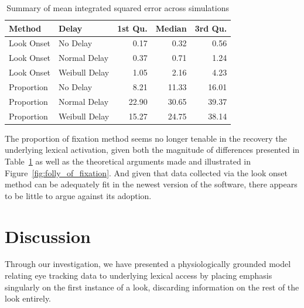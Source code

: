 \begin{table}[H]
\centering
\begin{tabular}{llrrr}
  \hline
Method & Delay & 1st Qu. & Median & 3rd Qu. \\ 
  \hline
Look Onset & No Delay & 0.17 & 0.32 & 0.56 \\ 
  Look Onset & Normal Delay & 0.37 & 0.71 & 1.24 \\ 
  Look Onset & Weibull Delay & 1.05 & 2.16 & 4.23 \\ 
  Proportion & No Delay & 8.21 & 11.33 & 16.01 \\ 
  Proportion & Normal Delay & 22.90 & 30.65 & 39.37 \\ 
  Proportion & Weibull Delay & 15.27 & 24.75 & 38.14 \\ 
   \hline
\end{tabular}
\caption{Summary of mean integrated squared error across simulations}
\label{tab:mise_sims}
\end{table}

The proportion of fixation method seems no longer tenable in the recovery the underlying lexical activation, given both the magnitude of differences presented in Table~\ref{tab:mise_sims} as well as the theoretical arguments made and illustrated in Figure~\ref{fig:folly_of_fixation}. And given that data collected via the look onset method can be adequately fit in the newest version of the  software, there appears to be little to argue against its adoption.


\section{Discussion}


Through our investigation, we have presented a physiologically grounded model relating eye tracking data to underlying lexical access by placing emphasis singularly on the first instance of a look, discarding information on the rest of the look entirely. 

